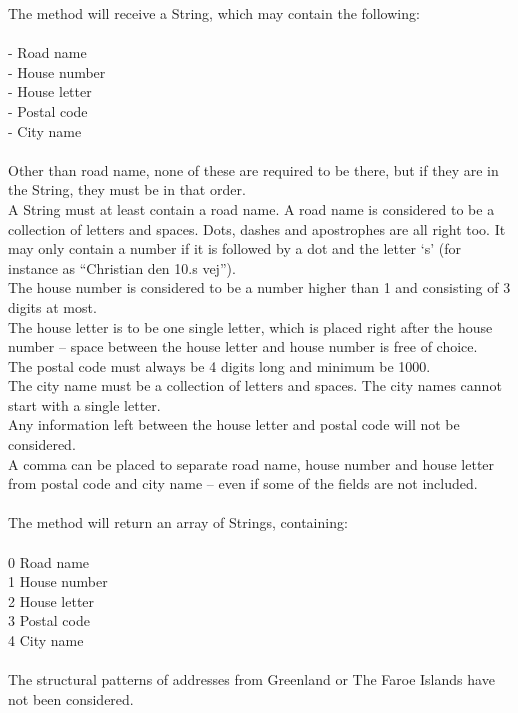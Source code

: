\documentclass[a4paper,10pt,titlepage]{article}
\begin{document}
The method will receive a String, which may contain the following:\\
\\
-	Road name\\
-	House number\\
-	House letter\\
-	Postal code\\
-	City name\\
\\
Other than road name, none of these are required to be there, but if they are in the String, they must be in that order.\\
A String must at least contain a road name. A road name is considered to be a collection of letters and spaces. Dots, dashes and apostrophes are all right too. It may only contain a number if it is followed by a dot and the letter ‘s’ (for instance as “Christian den 10.s vej”).\\
The house number is considered to be a number higher than 1 and consisting of 3 digits at most.\\
The house letter is to be one single letter, which is placed right after the house number – space between the house letter and house number is free of choice.\\
The postal code must always be 4 digits long and minimum be 1000.\\
The city name must be a collection of letters and spaces. The city names cannot start with a single letter.\\
Any information left between the house letter and postal code will not be considered.\\
A comma can be placed to separate road name, house number and house letter from postal code and city name – even if some of the fields are not included.\\
\\
The method will return an array of Strings, containing:\\
\\
0	Road name\\
1	House number\\
2	House letter\\
3	Postal code\\
4	City name\\
\\
The structural patterns of addresses from Greenland or The Faroe Islands have not been considered.\\

	\newpage
\end{document}
